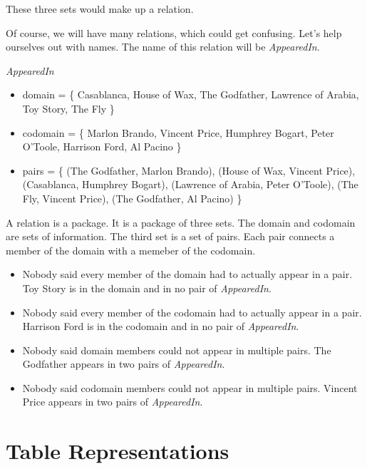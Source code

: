 \documentclass{ximera}
\begin{document}
These three sets would make up a relation. 

Of course, we will have many relations, which could get confusing.  Let's help ourselves out with names.  The name of this relation will be \textit{AppearedIn}.


\begin{example} \textit{AppearedIn} \\
\begin{itemize}
\item domain = \{ Casablanca, House of Wax,  The Godfather, Lawrence of Arabia, Toy Story, The Fly \}  
\item codomain = \{ Marlon Brando, Vincent Price, Humphrey Bogart, Peter O'Toole, Harrison Ford, Al Pacino  \} 
\item pairs = \{ (The Godfather, Marlon Brando), (House of Wax, Vincent Price), (Casablanca, Humphrey Bogart), (Lawrence of Arabia, Peter O'Toole), (The Fly, Vincent Price), (The Godfather, Al Pacino) \} 
\end{itemize}
\end{example}


A relation is a package.  It is a package of three sets. The domain and codomain are sets of information.  The third set is a set of pairs.  Each pair connects a member of the domain with a memeber of the codomain. 

\begin{observation}
\begin{itemize}
\item Nobody said every member of the domain had to actually appear in a pair.  Toy Story is in the domain and in no pair of \textit{AppearedIn}.
\item Nobody said every member of the codomain had to actually appear in a pair.  Harrison Ford is in the codomain and in no pair of \textit{AppearedIn}.
\item Nobody said domain members could not appear in multiple pairs.  The Godfather appears in two pairs of \textit{AppearedIn}.
\item Nobody said codomain members could not appear in multiple pairs.  Vincent Price appears in two pairs of \textit{AppearedIn}.
\end{itemize}
\end{observation}




\section{Table Representations}
\end{document}
